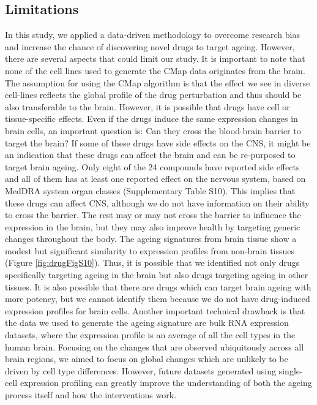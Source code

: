 \documentclass[12pt,twoside]{unicam}
\begin{document}
\hypertarget{limitations-2}{%
\subsection{Limitations}\label{limitations-2}}

In this study, we applied a data-driven methodology to overcome research bias and increase the chance of discovering novel drugs to target ageing. However, there are several aspects that could limit our study. It is important to note that none of the cell lines used to generate the CMap data originates from the brain. The assumption for using the CMap algorithm is that the effect we see in diverse cell-lines reflects the global profile of the drug perturbation and thus should be also transferable to the brain. However, it is possible that drugs have cell or tissue-specific effects. Even if the drugs induce the same expression changes in brain cells, an important question is: Can they cross the blood-brain barrier to target the brain? If some of these drugs have side effects on the CNS, it might be an indication that these drugs can affect the brain and can be re-purposed to target brain ageing. Only eight of the 24 compounds have reported side effects and all of them has at least one reported effect on the nervous system, based on MedDRA system organ classes (Supplementary Table S10). This implies that these drugs can affect CNS, although we do not have information on their ability to cross the barrier. The rest may or may not cross the barrier to influence the expression in the brain, but they may also improve health by targeting generic changes throughout the body. The ageing signatures from brain tissue show a modest but significant similarity to expression profiles from non-brain tissues (Figure \ref{fig:drugFigS10}). Thus, it is possible that we identified not only drugs specifically targeting ageing in the brain but also drugs targeting ageing in other tissues. It is also possible that there are drugs which can target brain ageing with more potency, but we cannot identify them because we do not have drug-induced expression profiles for brain cells. Another important technical drawback is that the data we used to generate the ageing signature are bulk RNA expression datasets, where the expression profile is an average of all the cell types in the human brain. Focusing on the changes that are observed ubiquitously across all brain regions, we aimed to focus on global changes which are unlikely to be driven by cell type differences. However, future datasets generated using single-cell expression profiling can greatly improve the understanding of both the ageing process itself and how the interventions work.
\end{document}
